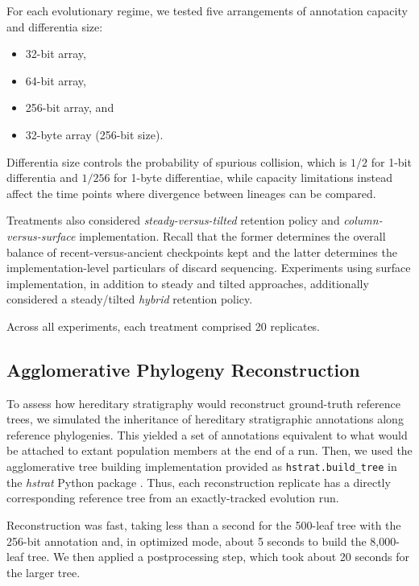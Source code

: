 
For each evolutionary regime, we tested five arrangements of annotation capacity and differentia size:
\begin{itemize}
  \item 32-bit array,
  \item 64-bit array,
  \item 256-bit array, and
  \item 32-byte array (256-bit size).
\end{itemize}

Differentia size controls the probability of spurious collision, which is $1/2$ for 1-bit differentia and $1/256$ for 1-byte differentiae, while capacity limitations instead affect the time points where divergence between lineages can be compared.

Treatments also considered \textit{steady-versus-tilted} retention policy and \textit{column-versus-surface} implementation.
Recall that the former determines the overall balance of recent-versus-ancient checkpoints kept and the latter determines the implementation-level particulars of discard sequencing.
Experiments using surface implementation, in addition to steady and tilted approaches, additionally considered a steady/tilted \textit{hybrid} retention policy.

Across all experiments, each treatment comprised 20 replicates.

\subsection{Agglomerative Phylogeny Reconstruction}

To assess how hereditary stratigraphy would reconstruct ground-truth reference trees, we simulated the inheritance of hereditary stratigraphic annotations along reference phylogenies.
This yielded a set of annotations equivalent to what would be attached to extant population members at the end of a run.
Then, we used the agglomerative tree building implementation provided as \texttt{hstrat.build\_tree} in the \textit{hstrat} Python package \citep{moreno2022hstrat}.
Thus, each reconstruction replicate has a directly corresponding reference tree from an exactly-tracked evolution run.

Reconstruction was fast, taking less than a second for the 500-leaf tree with the 256-bit annotation and, in optimized mode, about 5 seconds to build the 8,000-leaf tree.
We then applied a postprocessing step, which took about 20 seconds for the larger tree.

